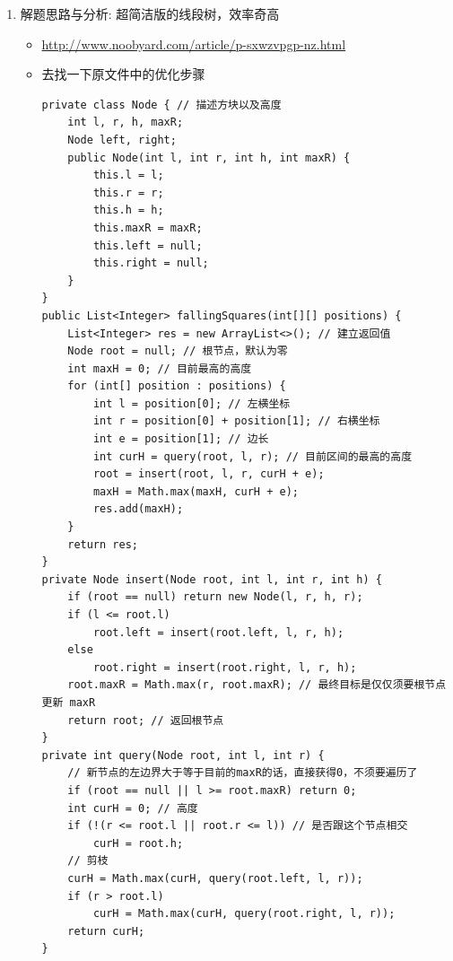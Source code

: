 \documentclass[9pt, b5paaper]{book}
\begin{document}
\begin{enumerate}
\begin{verbatim}
            tree[i].v = tree[i].lazy = c; // 这里 tree[i].v = tree[i].lazy = c : c 是想要更新到的新值v, 用它来更新懒标记和v值
            return ;
        }
        pushDown(i);  // 任务不得不下发，则先下发给两个孩子
        int m = tree[i].l + tree[i].r >> 1;
        if (l <= m) update(i << 1, l, r, c);  // 回归调用，下传更新至左右子节点
        if (m + 1 <= r) update(i << 1 | 1, l, r, c);
        pushUp(i);  // 孩子完成了任务，再修改自己的值
    }
    int query(int i, int l, int r) {
        if (l <= tree[i].l && r >= tree[i].r) return tree[i].v;
        pushDown(i);
        int ans = 0, m = tree[i].l + tree[i].r >> 1;
        if (l <= m) ans = Math.max(ans, query(i << 1, l, r));
        if (m + 1 <= r) ans = Math.max(ans, query(i << 1 | 1, l, r));
        return ans;
    }
    int query() {
        return tree[1].v;
    }
}
\end{verbatim}
\item 解题思路与分析: 超简洁版的线段树，效率奇高
\label{sec-1-1-5-3}
\begin{itemize}
\item \url{http://www.noobyard.com/article/p-sxwzvpgp-nz.html}
\item 去找一下原文件中的优化步骤
\begin{verbatim}
private class Node { // 描述方块以及高度
    int l, r, h, maxR;
    Node left, right;
    public Node(int l, int r, int h, int maxR) {
        this.l = l;
        this.r = r;
        this.h = h;
        this.maxR = maxR;
        this.left = null;
        this.right = null;
    }
}
public List<Integer> fallingSquares(int[][] positions) {
    List<Integer> res = new ArrayList<>(); // 建立返回值
    Node root = null; // 根节点，默认为零
    int maxH = 0; // 目前最高的高度
    for (int[] position : positions) {
        int l = position[0]; // 左横坐标
        int r = position[0] + position[1]; // 右横坐标
        int e = position[1]; // 边长
        int curH = query(root, l, r); // 目前区间的最高的高度
        root = insert(root, l, r, curH + e);
        maxH = Math.max(maxH, curH + e);
        res.add(maxH);
    }
    return res;
}
private Node insert(Node root, int l, int r, int h) {
    if (root == null) return new Node(l, r, h, r);
    if (l <= root.l)
        root.left = insert(root.left, l, r, h);
    else
        root.right = insert(root.right, l, r, h);
    root.maxR = Math.max(r, root.maxR); // 最终目标是仅仅须要根节点更新 maxR
    return root; // 返回根节点
}
private int query(Node root, int l, int r) {
    // 新节点的左边界大于等于目前的maxR的话，直接获得0，不须要遍历了
    if (root == null || l >= root.maxR) return 0; 
    int curH = 0; // 高度
    if (!(r <= root.l || root.r <= l)) // 是否跟这个节点相交
        curH = root.h;
    // 剪枝
    curH = Math.max(curH, query(root.left, l, r));
    if (r > root.l)
        curH = Math.max(curH, query(root.right, l, r));
    return curH;
}
\end{verbatim}
\end{itemize}
\end{enumerate}
\end{document}
